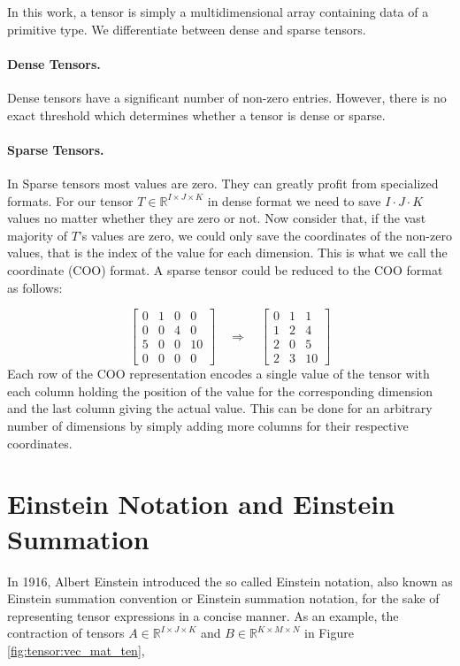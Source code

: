 \noindent
In this work, a tensor is simply a multidimensional array containing data of a
primitive type. We differentiate between dense and sparse tensors.

\paragraph{Dense Tensors.}
Dense tensors have a significant number of non-zero entries. However, there is no
exact threshold which determines whether a tensor is dense or sparse.

\paragraph{Sparse Tensors.}
In Sparse tensors most values are zero. They can greatly profit from specialized
formats. For our tensor $T \in \mathbb{R}^{I \times J \times K}$ in dense format
we need to save $I \cdot J \cdot K$ values no matter whether they are zero or not.
Now consider that, if the vast majority of $T$'s values are zero, we could only save
the coordinates of the non-zero values, that is the index of the value for each
dimension. This is what we call the coordinate (COO) format. A sparse tensor could
be reduced to the COO format as follows:

\begin{equation*}
    \begin{bmatrix}
        0 & 1 & 0 & 0  \\
        0 & 0 & 4 & 0  \\
        5 & 0 & 0 & 10 \\
        0 & 0 & 0 & 0
    \end{bmatrix}
    \quad
    \Rightarrow
    \quad
    \begin{bmatrix}
        0 & 1 & 1  \\
        1 & 2 & 4  \\
        2 & 0 & 5  \\
        2 & 3 & 10
    \end{bmatrix}
\end{equation*}
%
Each row of the COO representation encodes a single value of the tensor with each
column holding the position of the value for the corresponding dimension and the last
column giving the actual value. This can be done for an arbitrary number of dimensions
by simply adding more columns for their respective coordinates.

\section{Einstein Notation and Einstein Summation}
In 1916, Albert Einstein introduced the so called Einstein notation, also known as
Einstein summation convention or Einstein summation notation, for the sake of
representing tensor expressions in a concise manner. As an example, the contraction of tensors
$A \in \mathbb{R}^{I \times J \times K}$ and $B \in \mathbb{R}^{K \times M \times N}$
in Figure \ref{fig:tensor:vec_mat_ten},

